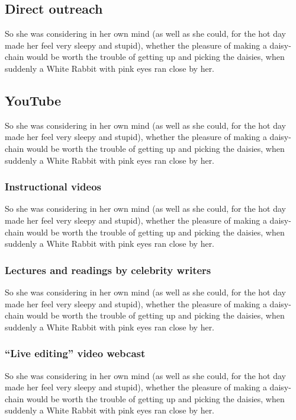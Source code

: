 \documentclass[12pt]{article}
\begin{document}
\subsection{Direct outreach}
\label{sec-4-5}
So she was considering in her own mind (as well as she could, for the hot day made her feel very sleepy and stupid), whether the pleasure of making a daisy-chain would be worth the trouble of getting up and picking the daisies, when suddenly a White Rabbit with pink eyes ran close by her. 

\subsection{YouTube}
\label{sec-4-6}
So she was considering in her own mind (as well as she could, for the hot day made her feel very sleepy and stupid), whether the pleasure of making a daisy-chain would be worth the trouble of getting up and picking the daisies, when suddenly a White Rabbit with pink eyes ran close by her. 

\subsubsection{Instructional videos}
\label{sec-4-6-1}
So she was considering in her own mind (as well as she could, for the hot day made her feel very sleepy and stupid), whether the pleasure of making a daisy-chain would be worth the trouble of getting up and picking the daisies, when suddenly a White Rabbit with pink eyes ran close by her. 

\subsubsection{Lectures and readings by celebrity writers}
\label{sec-4-6-2}
So she was considering in her own mind (as well as she could, for the hot day made her feel very sleepy and stupid), whether the pleasure of making a daisy-chain would be worth the trouble of getting up and picking the daisies, when suddenly a White Rabbit with pink eyes ran close by her. 

\subsubsection{``Live editing'' video webcast}
\label{sec-4-6-3}
So she was considering in her own mind (as well as she could, for the hot day made her feel very sleepy and stupid), whether the pleasure of making a daisy-chain would be worth the trouble of getting up and picking the daisies, when suddenly a White Rabbit with pink eyes ran close by her. 
\end{document}
